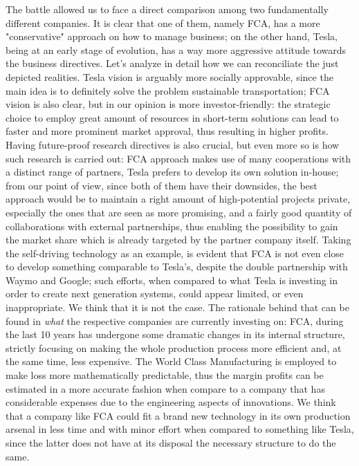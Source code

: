 The battle allowed us to face a direct comparison among two fundamentally different companies. It is clear that one of them, namely FCA, has a more "conservative" approach on how to manage business; on the other hand, Tesla, being at an early stage of evolution, has a way more aggressive attitude towards the business directives. Let's analyze in detail how we can reconciliate the just depicted realities.
Tesla vision is arguably more socially approvable, since the main idea is to definitely solve the problem sustainable transportation; FCA vision is also clear, but in our opinion is more investor-friendly: the strategic choice to employ great amount of resources in short-term solutions can lead to faster and more prominent market approval, thus resulting in higher profits. 
Having future-proof research directives is also crucial, but even more so is how such research is carried out: FCA approach makes use of many cooperations with a distinct range of partners, Tesla prefers to develop its own solution in-house; from our point of view, since both of them have their downsides, the best approach would be to maintain a right amount of high-potential projects private, especially the ones that are seen as more promising, and a fairly good quantity of collaborations with external partnerships, thus enabling the possibility to gain the market share which is already targeted by the partner company itself.
Taking the self-driving technology as an example, is evident that FCA is not even close to develop something comparable to Tesla's, despite the double partnership with Waymo and Google; such efforts, when compared to what Tesla is investing in order to create next generation systems, could appear limited, or even inappropriate. We think that it is not the case. The rationale behind that can be found in \emph{what} the respective companies are currently investing on: FCA, during the last 10 years has undergone some dramatic changes in its internal structure, strictly focusing on making the whole production process more efficient and, at the same time, less expensive. The World Class Manufacturing is employed to make loss more mathematically predictable, thus the margin profits can be estimated in a more accurate fashion when compare to a company that has considerable expenses due to the engineering aspects of innovations. We think that a company like FCA could fit a brand new technology in its own production arsenal in less time and with minor effort when compared to something like Tesla, since the latter does not have at its disposal the necessary structure to do the same. 

